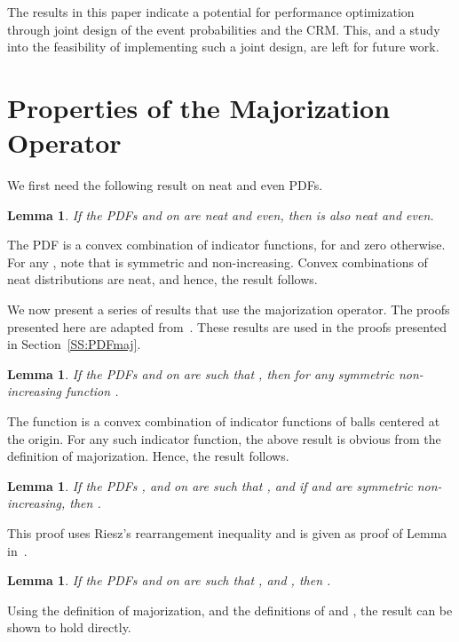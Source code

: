 \documentclass[twocolumn]{autart}
\newtheorem{lemma}[theorem]{Lemma}
\newenvironment{proof}[1][Proof]{\begin{trivlist}
\item[\hskip \labelsep {\bfseries #1}]}{\end{trivlist}}
\renewcommand{\qed}{}
\begin{document}
The results in this paper indicate a potential for performance optimization through joint design of the event probabilities and the CRM. This, and a study into the feasibility of implementing such a joint design, are left for future work.






\appendix
\section{Properties of the Majorization Operator} \label{App:MajLemmas}

We first need the following result on neat and even PDFs.
\begin{lemma} \label{Lemma:SymmNIConv}
If the PDFs  and  on  are neat and even, then  is also neat and even.
\end{lemma}
\begin{proof}
The PDF  is a convex combination of indicator functions,  for  and zero otherwise. For any , note that  is symmetric and non-increasing. Convex combinations of neat distributions are neat, and hence, the result follows. \hfill \qed
\end{proof}

We now present a series of results that use the majorization operator. The proofs presented here are adapted from~\cite{Hajek2008}. These results are used in the proofs presented in Section~\ref{SS:PDFmaj}.
\begin{lemma} \label{Lemma:Maj1}
If the PDFs  and  on  are such that , then  for any symmetric non-increasing function .
\end{lemma}
\begin{proof}
The function  is a convex combination of indicator functions of balls centered at the origin. For any such indicator function, the above result is obvious from the definition of majorization. Hence, the result follows. \hfill \qed
\end{proof}

\begin{lemma} \label{Lemma:Maj2}
If the PDFs ,  and  on  are such that , and if  and  are symmetric non-increasing, then .
\end{lemma}
This proof uses Riesz's rearrangement inequality and is given as proof of Lemma~ in~\cite{Hajek2008}.

\begin{lemma} \label{Lemma:Maj3}
If the PDFs  and  on  are such that , and , then .
\end{lemma}
\begin{proof}
Using the definition of majorization, and the definitions of  and , the result can be shown to hold directly. \hfill \qed
\end{proof}
\end{document}
